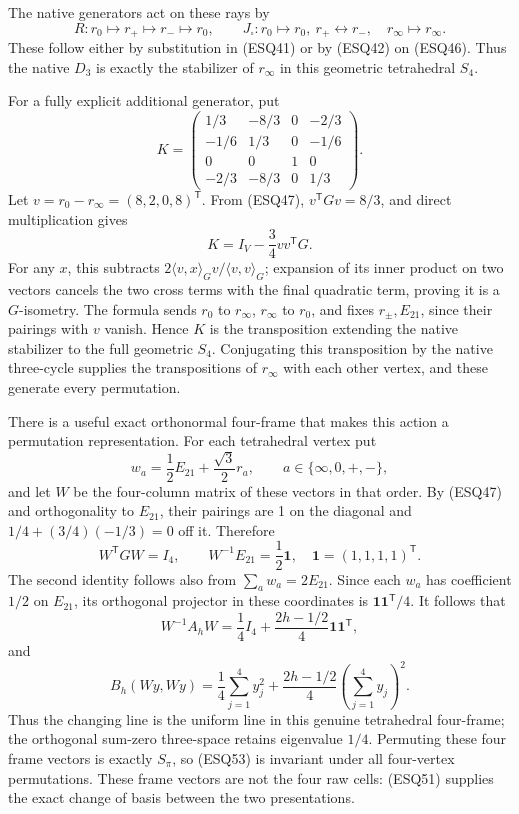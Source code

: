\documentclass[
  10pt,
  a4paper,
]{article}
\begin{document}
The native generators act on these rays by \[
R:r_0\mapsto r_+\mapsto r_-\mapsto r_0,
\qquad J_\square:r_0\mapsto r_0,\ r_+\leftrightarrow r_-,
\quad r_\infty\mapsto r_\infty.
\tag{ESQ48}
\] These follow either by substitution in (ESQ41) or by (ESQ42) on
(ESQ46). Thus the native \(D_3\) is exactly the stabilizer of
\(r_\infty\) in this geometric tetrahedral \(S_4\).

For a fully explicit additional generator, put \[
K=\begin{pmatrix}
1/3&-8/3&0&-2/3\\
-1/6&1/3&0&-1/6\\
0&0&1&0\\
-2/3&-8/3&0&1/3
\end{pmatrix}.
\tag{ESQ49}
\] Let \(v=r_0-r_\infty=(8,2,0,8)^{\mathsf T}\). From (ESQ47),
\(v^{\mathsf T}Gv=8/3\), and direct multiplication gives \[
K=I_V-\frac34v v^{\mathsf T}G.
\tag{ESQ50}
\] For any \(x\), this subtracts
\(2\langle v,x\rangle_Gv/\langle v,v\rangle_G\); expansion of its inner
product on two vectors cancels the two cross terms with the final
quadratic term, proving it is a \(G\)-isometry. The formula sends
\(r_0\) to \(r_\infty\), \(r_\infty\) to \(r_0\), and fixes
\(r_\pm,E_{21}\), since their pairings with \(v\) vanish. Hence \(K\) is
the transposition extending the native stabilizer to the full geometric
\(S_4\). Conjugating this transposition by the native three-cycle
supplies the transpositions of \(r_\infty\) with each other vertex, and
these generate every permutation.

There is a useful exact orthonormal four-frame that makes this action a
permutation representation. For each tetrahedral vertex put \[
w_a=\frac12E_{21}+\frac{\sqrt3}{2}r_a,
\qquad a\in\{\infty,0,+,-\},
\tag{ESQ51}
\] and let \(W\) be the four-column matrix of these vectors in that
order. By (ESQ47) and orthogonality to \(E_{21}\), their pairings are 1
on the diagonal and \(1/4+(3/4)(-1/3)=0\) off it. Therefore \[
W^{\mathsf T}GW=I_4,\qquad
W^{-1}E_{21}=\frac12\mathbf1,
\quad \mathbf1=(1,1,1,1)^{\mathsf T}.
\tag{ESQ52}
\] The second identity follows also from \(\sum_aw_a=2E_{21}\). Since
each \(w_a\) has coefficient \(1/2\) on \(E_{21}\), its orthogonal
projector in these coordinates is \(\mathbf1\mathbf1^{\mathsf T}/4\). It
follows that \[
W^{-1}A_hW
=\frac14I_4+\frac{2h-1/2}{4}\mathbf1\mathbf1^{\mathsf T},
\tag{ESQ53}
\] and \[
B_h(Wy,Wy)=\frac14\sum_{j=1}^4y_j^2
+\frac{2h-1/2}{4}\left(\sum_{j=1}^4y_j\right)^2.
\tag{ESQ54}
\] Thus the changing line is the uniform line in this genuine
tetrahedral four-frame; the orthogonal sum-zero three-space retains
eigenvalue \(1/4\). Permuting these four frame vectors is exactly
\(S_\pi\), so (ESQ53) is invariant under all four-vertex permutations.
These frame vectors are not the four raw cells: (ESQ51) supplies the
exact change of basis between the two presentations.
\end{document}
